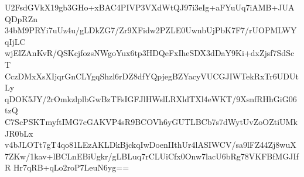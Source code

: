 U2FsdGVkX19gb3GHo+xBAC4PIVP3VXdWtQJ97i3eIg+aFYuUq7iAMB+JUAQDpRZn
34bM9PRYi7uUz4u/gLDkZG7/Zr9XFidw2PZLE0UwnbUjPbK7F7/rUOPMLWYqIjLC
wjElZAnKvR/QSKcjfozsNWgoYux6tp3HDQeFxIheSDX3dDaY9Ki+dxZjsf7SdScT
CczDMxXsXIjqrGnCLYgqShzl6rDZ8dfYQpjegBZYacyVUCGJIWTekRxTr6UDUtLy
qDOK5JY/2rOmkzlplbGwBzTFsIGFJlHWslLRXldTXl4eWKT/9XsnfRHhGiG06tzQ
C7ScPSKTmyftIMG7cGAKVP4sR9BCOVh6yGUTLBCb7s7dWytUvZoOZtiUMkJR0bLx
v4bJLOTt7gT4qo81LEzAKLDkBjckqIwDoenIIthUr4lASIWCV/sa9lFZ44Zj8wuX
7ZKw/1kav+lBCLnEBiUgkr/gLBLuq7rCLUiCfx0Onw7lacU6bRg78VKFBfMGJIfR
Hr7qRB+qLo2roP7LeuN6yg==
